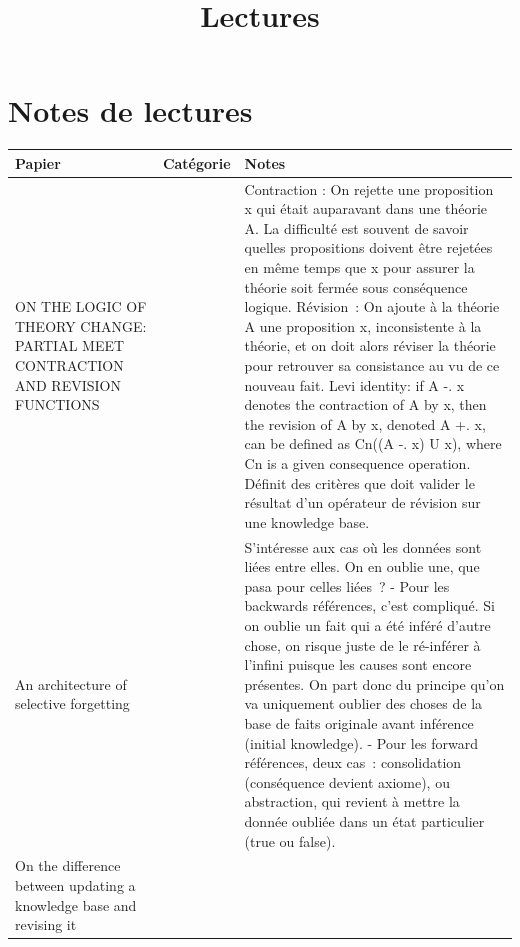 \documentclass[french]{article}
\begin{document}
    \title{Lectures}
    \maketitle

    \section{Notes de lectures}
    \begin{table}[h]
        \begin{center}
        \begin{tabular}{|p{}|p{}|p{}|}
            \hline
            Papier & Catégorie & Notes \\
            \hline
            ON THE LOGIC OF THEORY CHANGE: PARTIAL MEET CONTRACTION AND REVISION FUNCTIONS \cite{alchourron_logic_1985}
            & 
            & Contraction : On rejette une proposition x qui était auparavant dans une théorie A. La difficulté est souvent de savoir quelles propositions doivent être rejetées en même temps que x pour assurer la théorie soit fermée sous conséquence logique. Révision : On ajoute à la théorie A une proposition x, inconsistente à la théorie, et on doit alors réviser la théorie pour retrouver sa consistance au vu de ce nouveau fait.
            Levi identity: if A -. x denotes the contraction of A by x, then the revision of A by x, denoted A +. x, can be defined as Cn((A -. x) U {x}), where Cn is a given consequence operation.
            Définit des critères que doit valider le résultat d'un opérateur de révision sur une knowledge base. \\
            \hline
            An architecture of selective forgetting \cite{euzenat_architecture_1991}
            &
            & S’intéresse aux cas où les données sont liées entre elles. On en oublie une, que pasa pour celles liées ?
            - Pour les backwards références, c’est compliqué. Si on oublie un fait qui a été inféré d’autre chose, on risque juste de le ré-inférer à l’infini puisque les causes sont encore présentes. On part donc du principe qu’on va uniquement oublier des choses de la base de faits originale avant inférence (initial knowledge).
            - Pour les forward références, deux cas : consolidation (conséquence devient axiome), ou abstraction, qui revient à mettre la donnée oubliée dans un état particulier (true ou false).  \\
            \hline
            On the difference between updating a knowledge base and revising it \cite{katsuno_difference_1991}

\end{tabular}
\end{center}
\end{table}
\end{document}
